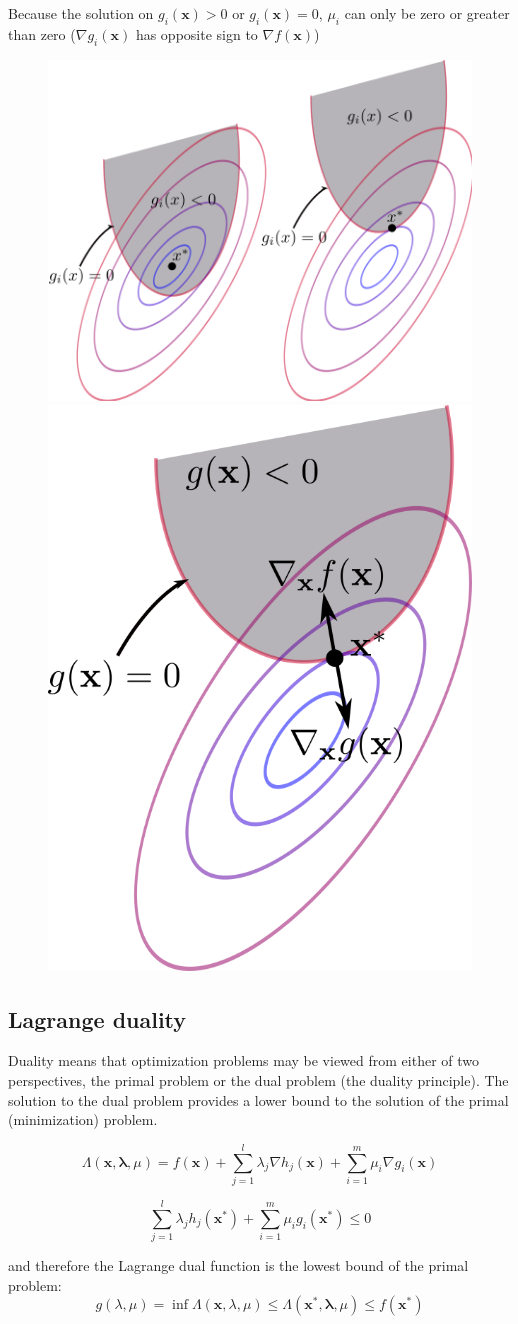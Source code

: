 \documentclass[twocolumn]{article}
\numberwithin{equation}{section}
\begin{document}
Because the solution on $g_i(\mathbf{x})>0$ or $g_i(\mathbf{x})=0$, $\mu_i$ can only be zero or greater than zero ($\nabla g_i(\mathbf{x})$ has opposite sign to $\nabla f(\mathbf{x})$)
 
 \begin{figure}[H]
	\centering
    \includegraphics[width=.26\textwidth]{440px-Inequality_constraint_diagram.png}
    \includegraphics[width=.15\textwidth]{signofkkt.png}
\end{figure}

	\subsection{Lagrange duality}
Duality means that optimization problems may be viewed from either of two perspectives, the primal problem or the dual problem (the duality principle). The solution to the dual problem provides a lower bound to the solution of the primal (minimization) problem.

$$ \Lambda(\mathbf{x},\mathbf{\lambda},\mu) = f(\mathbf{x})  + \sum_{j=1}^l \lambda_j \nabla h_j(\mathbf{x}) +\sum_{i=1}^m \mu_i \nabla g_i(\mathbf{x})$$

$$\sum_{j=1}^l \lambda_j h_j(\mathbf{x^*}) +\sum_{i=1}^m \mu_i  g_i(\mathbf{x^*}) \le 0$$

and therefore the Lagrange dual function is the lowest bound of the primal problem:
$$g(\lambda,\mu) = \inf \Lambda(\mathbf{x},\lambda,\mu) \le \Lambda(\mathbf{x^*},\mathbf{\lambda},\mu) \le f(\mathbf{x^*})$$
\end{document}
